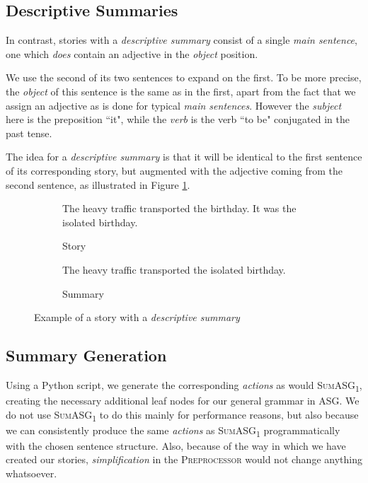 \subsection{Descriptive Summaries}

In contrast, stories with a \textit{descriptive summary} consist of a single \textit{main sentence}, one which \textit{does} contain an adjective in the \textit{object} position.

We use the second of its two sentences to expand on the first. To be more precise, the \textit{object} of this sentence is the same as in the first, apart from the fact that we assign an adjective as is done for typical \textit{main sentences}. However the \textit{subject} here is the preposition ``it", while the \textit{verb} is the verb ``to be" conjugated in the past tense.

The idea for a \textit{descriptive summary} is that it will be identical to the first sentence of its corresponding story, but augmented with the adjective coming from the second sentence, as illustrated in Figure \ref{fig:descriptive_summary_example}.

\begin{figure}[H]
\begin{subfigure}{\textwidth}
\begin{displayquote}
The heavy traffic transported the birthday. It was the isolated birthday.
\end{displayquote}
\caption{Story}
\vspace{\baselineskip}
\end{subfigure}
\begin{subfigure}{\textwidth}
\begin{displayquote}
The heavy traffic transported the isolated birthday.
\end{displayquote}
\caption{Summary}
\end{subfigure}
\caption{Example of a story with a \textit{descriptive summary}}
\label{fig:descriptive_summary_example}
\end{figure}

\subsection{Summary Generation}

Using a Python script, we generate the corresponding \textit{actions} as would \textsc{SumASG\textsubscript{1}}, creating the necessary additional leaf nodes for our general grammar in ASG. We do not use \textsc{SumASG\textsubscript{1}} to do this mainly for performance reasons, but also because we can consistently produce the same \textit{actions} as \textsc{SumASG\textsubscript{1}} programmatically with the chosen sentence structure. Also, because of the way in which we have created our stories, \textit{simplification} in the \textsc{Preprocessor} would not change anything whatsoever.

